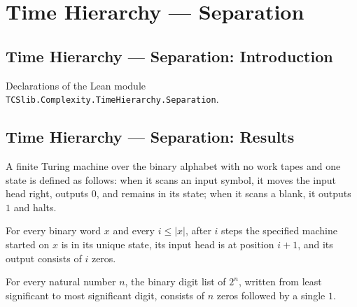 \section{Time Hierarchy --- Separation}
\subsection*{Time Hierarchy --- Separation: Introduction}

Declarations of the Lean module \texttt{TCSlib.Complexity.TimeHierarchy.Separation}.

\subsection*{Time Hierarchy --- Separation: Results}

\begin{definition}
\label{Complexity.twoPowTM}
\leanok
{}
A finite Turing machine over the binary alphabet with no work tapes and one state is
defined as follows: when it scans an input symbol, it moves the input head right,
outputs $0$, and remains in its state; when it scans a blank, it outputs $1$ and halts.
\end{definition}

\begin{lemma}
\label{Complexity.twoPowTM_run}
\leanok
{}
For every binary word $x$ and every $i\le |x|$, after $i$ steps the specified machine
started on $x$ is in its unique state, its input head is at position $i+1$, and its
output consists of $i$ zeros.
\end{lemma}

\begin{lemma}
\label{Complexity.bits_two_pow}
\leanok
{}
For every natural number $n$, the binary digit list of $2^n$, written from least
significant to most significant digit, consists of $n$ zeros followed by a single $1$.
\end{lemma}

